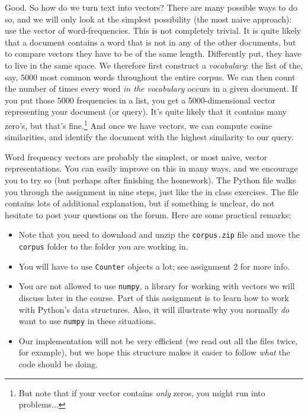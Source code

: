 \documentclass[11pt, a4paper]{article}
\begin{document}
Good. 
So how do we turn text into vectors?
There are many possible ways to do so, and we will only look at the simplest possibility (the most naive approach): use the vector of word-frequencies.
This is not completely trivial.
It is quite likely that a document contains a word that is not in any of the other documents, but to compare vectors they have to be of the same length.
Differently put, they have to live in the same space.
We therefore first construct a \emph{vocabulary}: the list of the, say, 5000 most common words throughout the entire corpus.
We can then count the number of times every word \emph{in the vocabulary} occurs in a given document. 
If you put those $5000$ frequencies in a list, you get a 5000-dimensional vector representing your document (or query).
It's quite likely that it contains many zero's, but that's fine.\footnote{But note that if your vector contains \emph{only} zeros, you might run into problems...} 
And once we have vectors, we can compute cosine similarities, and identify the document with the highest similarity to our query.


Word frequency vectors are probably the simplest, or most naive, vector representations. 
You can easily improve on this in many ways, and we encourage you to try so (but perhaps after finishing the homework). 
The Python file walks you through the assignment in nine steps, just like the in class exercises. 
The file contains lots of additional explanation, but if something is unclear, do not hesitate to post your questions on the forum. Here are some practical remarks:

\begin{itemize}
  \item Note that you need to download and unzip the \texttt{corpus.zip} file and move the \texttt{corpus} folder to the folder you are working in. 
  \item You will have to use \texttt{Counter} objects a lot; see assignment 2 for more info.
  \item You are not allowed to use \texttt{numpy}, a library for working with vectors we will discuss later in the course. Part of this assignment is to learn how to work with Python's data structures. Also, it will illustrate why you normally \emph{do} want to use \texttt{numpy} in these situations.
  \item Our implementation will not be very efficient (we read out all the files twice, for example), but we hope this structure makes it easier to follow \emph{what} the code should be doing. 
\end{itemize}
\end{document}
